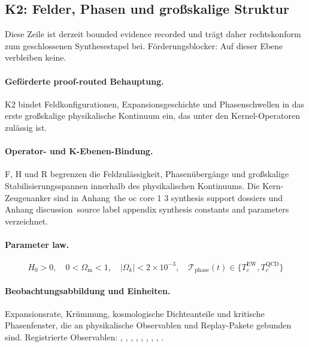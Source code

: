 \subsection{K2: Felder, Phasen und großskalige Struktur}
\label{sec:oc-core-1-3-synthesis-k2}
Diese Zeile ist derzeit bounded evidence recorded und trägt daher rechtskonform zum geschlossenen Synthesestapel bei.
Förderungsblocker: Auf dieser Ebene verbleiben keine.

\paragraph{Geförderte proof-routed Behauptung.}
K2 bindet Feldkonfigurationen, Expansionsgeschichte und Phasenschwellen in das erste großskalige physikalische Kontinuum ein, das unter den Kernel-Operatoren zulässig ist.

\paragraph{Operator- und K-Ebenen-Bindung.}
F, H und R begrenzen die Feldzulässigkeit, Phasenübergänge und großskalige Stabilisierungsspannen innerhalb des physikalischen Kontinuums.
Die Kern-Zeugenanker sind in Anhang~the oc core 1 3 synthesis support dossiers und Anhang discussion~source label appendix synthesis constants and parameters verzeichnet.

\paragraph{Parameter law.}
\[
H_0 > 0,\quad 0 < \Omega_{\mathrm{m}} < 1,\quad |\Omega_k| < 2 \times 10^{-3},\quad \mathcal{T}_{\mathrm{phase}}(t) \in \{T_c^{\mathrm{EW}}, T_c^{\mathrm{QCD}}\}
\]

\paragraph{Beobachtungsabbildung und Einheiten.}
Expansionsrate, Krümmung, kosmologische Dichteanteile und kritische Phasenfenster, die an physikalische Observablen und Replay-Pakete gebunden sind.
Registrierte Observablen: , \allowbreak {}, \allowbreak {}, \allowbreak {}, \allowbreak {}, \allowbreak {}, \allowbreak {}, \allowbreak {}, \allowbreak {}.

